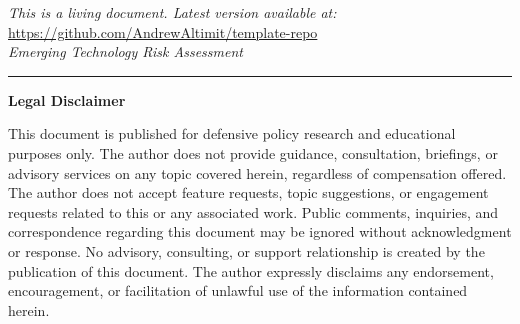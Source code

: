 \documentclass[11pt,letterpaper]{article}
\begin{document}
\vspace{0.1cm}

\begin{center}
\small
\textit{This is a living document. Latest version available at:}\\[0.3em]
\url{https://github.com/AndrewAltimit/template-repo}\\[0.3em]
\textit{Emerging Technology Risk Assessment}
\end{center}

\vspace{0.1cm}

\noindent\rule{\textwidth}{0.4pt}

\vspace{0.1cm}

\begin{center}
\small\textbf{Legal Disclaimer}
\end{center}

\vspace{0.1cm}

\noindent\footnotesize This document is published for defensive policy research and educational purposes only. The author does not provide guidance, consultation, briefings, or advisory services on any topic covered herein, regardless of compensation offered. The author does not accept feature requests, topic suggestions, or engagement requests related to this or any associated work. Public comments, inquiries, and correspondence regarding this document may be ignored without acknowledgment or response. No advisory, consulting, or support relationship is created by the publication of this document. The author expressly disclaims any endorsement, encouragement, or facilitation of unlawful use of the information contained herein.
\end{document}
